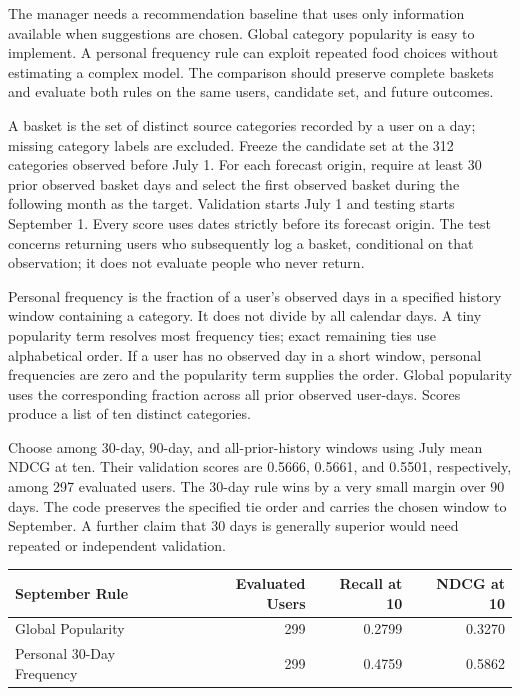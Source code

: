 \noindent The manager needs a recommendation baseline that uses only information
available when suggestions are chosen. Global category popularity is
easy to implement. A personal frequency rule can exploit repeated food
choices without estimating a complex model. The comparison should
preserve complete baskets and evaluate both rules on the same users,
candidate set, and future outcomes.

A basket is the set of distinct source categories recorded by a user on
a day; missing category labels are excluded. Freeze the candidate set at
the 312 categories observed before July 1. For each forecast origin,
require at least 30 prior observed basket days and select the first
observed basket during the following month as the target. Validation
starts July 1 and testing starts September 1. Every score uses dates
strictly before its forecast origin. The test concerns returning users
who subsequently log a basket, conditional on that observation; it does
not evaluate people who never return.

Personal frequency is the fraction of a user's observed days in a
specified history window containing a category. It does not divide by
all calendar days. A tiny popularity term resolves most frequency ties;
exact remaining ties use alphabetical order. If a user has no observed
day in a short window, personal frequencies are zero and the popularity
term supplies the order. Global popularity uses the corresponding
fraction across all prior observed user-days. Scores produce a list of
ten distinct categories.

Choose among 30-day, 90-day, and all-prior-history windows using July
mean NDCG at ten. Their validation scores are 0.5666, 0.5661, and
0.5501, respectively, among 297 evaluated users. The 30-day rule wins by
a very small margin over 90 days. The code preserves the specified tie
order and carries the chosen window to September. A further claim that
30 days is generally superior would need repeated or independent
validation.

\begin{table}[H]
\centering\small
\begin{tabular}{@{}lrrr@{}}
\toprule
September Rule & Evaluated Users & Recall at 10 & NDCG at 10 \\
\midrule

Global Popularity & 299 & 0.2799 & 0.3270 \\
Personal 30-Day Frequency & 299 & 0.4759 & 0.5862 \\
\bottomrule
\end{tabular}
\end{table}

